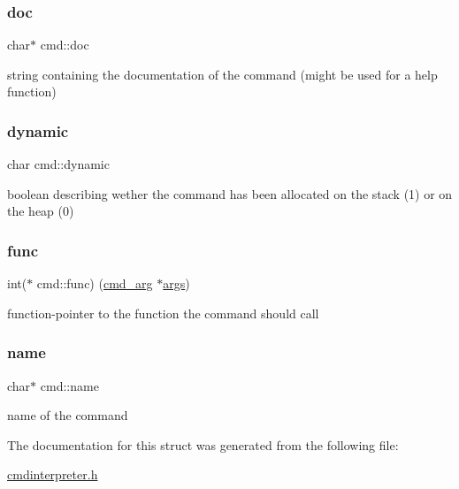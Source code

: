 \subsubsection{\texorpdfstring{doc}{doc}}
{\footnotesize\ttfamily char$\ast$ cmd\+::doc}

string containing the documentation of the command (might be used for a help function) \mbox{\label{structcmd_a5216a3541afd7bd7c7723dbf00391050}} 
\subsubsection{\texorpdfstring{dynamic}{dynamic}}
{\footnotesize\ttfamily char cmd\+::dynamic}

boolean describing wether the command has been allocated on the stack (1) or on the heap (0) \mbox{\label{structcmd_aaaab89491cf3cb6e38cb64e3a6395f19}} 
\subsubsection{\texorpdfstring{func}{func}}
{\footnotesize\ttfamily int($\ast$ cmd\+::func) (\mbox{\hyperlink{unioncmd__arg}{cmd\+\_\+arg}} $\ast$\mbox{\hyperlink{structcmd_a1ad1940c47b4b02db1483dfb13f70ad4}{args}})}

function-\/pointer to the function the command should call \mbox{\label{structcmd_a6ebcb67a0ff2d9a228d6fd6db6bbf1e6}} 
\subsubsection{\texorpdfstring{name}{name}}
{\footnotesize\ttfamily char$\ast$ cmd\+::name}

name of the command 

The documentation for this struct was generated from the following file\+:\begin{DoxyCompactItemize}
\item 
\mbox{\hyperlink{cmdinterpreter_8h}{cmdinterpreter.\+h}}\end{DoxyCompactItemize}

